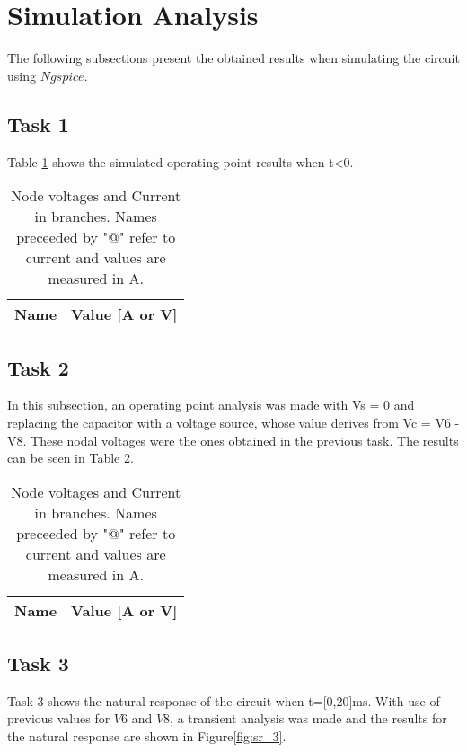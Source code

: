 \section{Simulation Analysis}
\label{sec:simulation}

The following subsections present the obtained results when simulating the circuit using $Ngspice$.

\subsection{Task 1}

Table \ref{tab:sr_1} shows the simulated operating point results when t<0.

\begin{table}[h]
  \centering
  \begin{tabular}{|l|r|}
    \hline    
    {\bf Name} & {\bf Value [A or V]} \\ \hline
    
  \end{tabular}
  \caption{Node voltages and Current in branches. Names preceeded by "@" refer to current and values are measured in A.}
  \label{tab:sr_1}
\end{table}

\newpage

\subsection{Task 2}
In this subsection, an operating point analysis was made with Vs = 0 and replacing the capacitor with a voltage source, whose value derives from Vc = V6 - V8. These nodal voltages were the ones obtained in the previous task. The results can be seen in Table \ref{tab:sr_2}.

\begin{table}[h]
  \centering
  \begin{tabular}{|l|r|}
    \hline    
    {\bf Name} & {\bf Value [A or V]} \\ \hline
    
  \end{tabular}
  \caption{Node voltages and Current in branches. Names preceeded by "@" refer to current and values are measured in A.}
  \label{tab:sr_2}
\end{table}

\newpage

\subsection{Task 3}
Task 3 shows the natural response of the circuit when t=[0,20]ms. With use of previous values for $V6$ and $V8$, a transient analysis was made and the results for the natural response are shown in Figure\ref{fig:sr_3}.

